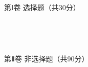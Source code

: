 \documentclass[10pt]{article}
\begin{document}
\showsecret
{}
\mathtxt
\paperinformation
\centerline{\large \heiti 第Ⅰ卷 \quad 选择题（共30分）} \par \ \par

\begin{questions}{\selectingintroduction}
    \question %
    \question %
    \question %
    \question %
    \question %
    \question %
    \question %
    \question %
    \question %
    \question %
\end{questions}

\par \ \par \centerline{\large \heiti 第Ⅱ卷 \quad 非选择题（共90分）} \par \ \par

\begin{questions}{\complitingintroduction}
    \question %
    \question %
    \question %
    \question %
    \question %
    \question %
\end{questions}

\begin{questions}{\answeringintroduction}
    \question %
    \begin{subquestions}
        \subquestion %
        \subquestion %
    \end{subquestions}
    \question %
    \begin{subquestions}
        \subquestion %
        \subquestion %
    \end{subquestions}
    \question %
    \begin{subquestions}
        \subquestion %
        \subquestion %
    \end{subquestions}
    \question %
    \begin{subquestions}
        \subquestion %
        \subquestion %
    \end{subquestions}
    \question %
    \begin{subquestions}
        \subquestion %
        \subquestion %
    \end{subquestions}
    \question %
    \begin{subquestions}
        \subquestion %
        \subquestion %
        \subquestion %
    \end{subquestions}
    \question %
    \begin{subquestions}
        \subquestion %
        \subquestion %
        \subquestion %
    \end{subquestions}
    \question %
    \begin{subquestions}
        \subquestion %
        \subquestion %
        \subquestion %
    \end{subquestions}
\end{questions}
\end{document}
